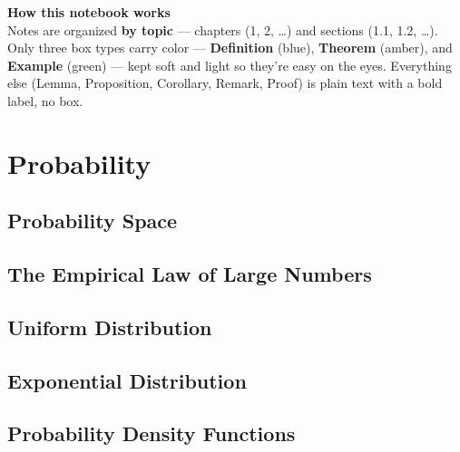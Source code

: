 \documentclass[11pt]{article}
\theoremstyle{quiet}
\theoremstyle{quietremark}
\newcommand{\1}{\mathbf{1}}            %
\begin{document}
\begin{titlepage}
\vfill

\begin{tcolorbox}[colback=black!2, colframe=neutralColor!35, width=0.7\textwidth,
 arc=1.5mm, boxrule=0.4pt]
\centering\small
\textbf{How this notebook works}\\[3pt]
Notes are organized \textbf{by topic} --- chapters (1, 2, \dots) and sections
(1.1, 1.2, \dots). Only three box types carry
color --- \textcolor{defColor!75!black}{\textbf{Definition}} (blue),
\textcolor{thmColor!60!black}{\textbf{Theorem}} (amber), and
\textcolor{exColor!70!black}{\textbf{Example}} (green) --- kept soft and light
so they're easy on the eyes. Everything else (Lemma, Proposition, Corollary,
Remark, Proof) is plain text with a bold label, no box.
\end{tcolorbox}

\vspace{1.0cm}
\end{titlepage}

\tableofcontents
\newpage

\section{Probability}

\subsection{Probability Space}

\subsection{The Empirical Law of Large Numbers}

\subsection{Uniform Distribution}

\subsection{Exponential Distribution}

\subsection{Probability Density Functions}
\end{document}
